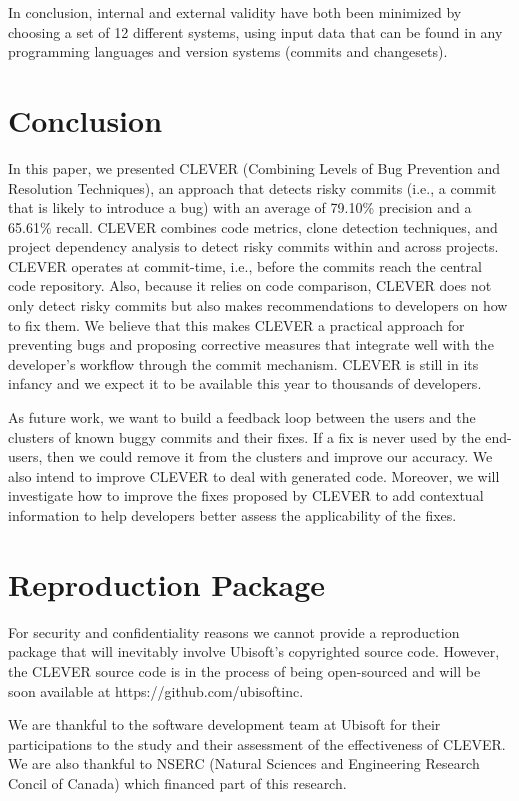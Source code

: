 \documentclass[sigconf]{acmart}
\begin{document}
In conclusion, internal and external validity have both been minimized
by choosing a set of 12 different systems, using input data that can be
found in any programming languages and version systems (commits and
changesets).

\section{Conclusion}\label{sec:conclusion}

In this paper, we presented CLEVER (Combining Levels of Bug Prevention
and Resolution Techniques), an approach that detects risky commits
(i.e., a commit that is likely to introduce a bug) with an average of
79.10\% precision and a 65.61\% recall. CLEVER combines code metrics,
clone detection techniques, and project dependency analysis to detect
risky commits within and across projects. CLEVER operates at
commit-time, i.e., before the commits reach the central code repository.
Also, because it relies on code comparison, CLEVER does not only detect
risky commits but also makes recommendations to developers on how to fix
them. We believe that this makes CLEVER a practical approach for
preventing bugs and proposing corrective measures that integrate well
with the developer's workflow through the commit mechanism. CLEVER is
still in its infancy and we expect it to be available this year to
thousands of developers.

As future work, we want to build a feedback loop between the users and
the clusters of known buggy commits and their fixes. If a fix is never
used by the end-users, then we could remove it from the clusters and
improve our accuracy. We also intend to improve CLEVER to deal with
generated code. Moreover, we will investigate how to improve the fixes
proposed by CLEVER to add contextual information to help developers
better assess the applicability of the fixes.

\section{Reproduction Package}\label{reproduction-package}

For security and confidentiality reasons we cannot provide a
reproduction package that will inevitably involve Ubisoft's copyrighted
source code. However, the CLEVER source code is in the process of being
open-sourced and will be soon available at
https://github.com/ubisoftinc.

\begin{acks}
We are thankful to the software development team at  Ubisoft for their participations to the study and their assessment of the effectiveness of CLEVER.
We are also thankful to NSERC (Natural Sciences and Engineering Research Concil of Canada) which financed part of this research.
\end{acks}
\end{document}
